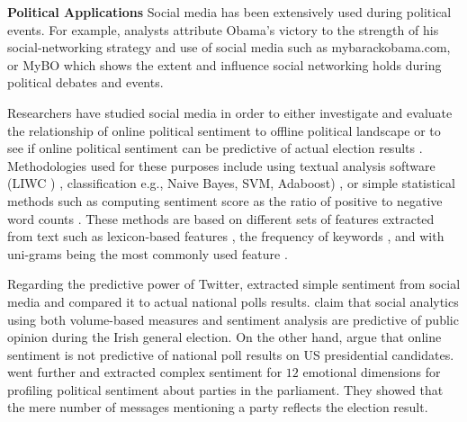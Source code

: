 \documentclass[11pt,a4paper]{article}
\begin{document}

\textbf{Political Applications}
Social media has been extensively used during political events. For example, analysts attribute Obama's victory to the strength of his social-networking strategy and use of social media such as mybarackobama.com, or MyBO \cite{tumasjan} which shows the extent and influence social networking holds during political debates and events.

Researchers have studied social media in order to either investigate and evaluate the relationship of online political sentiment to offline political landscape \cite{tumasjan, bakliwal, oconnorPolitics, wangCan} or to see if online political sentiment can be predictive of actual election results \cite{mejova, bermingham}. Methodologies used for these purposes include using textual analysis software (LIWC \cite{LWIC07}) \cite{tumasjan}, classification e.g., Naive Bayes, SVM, Adaboost) \cite{mejova, wangCan, bermingham, bakliwal}, or simple statistical methods such as computing sentiment score as the ratio of positive to negative word counts \cite{oconnorPolitics}. These methods are based on different sets of features extracted from text such as lexicon-based features \cite{bakliwal}, the frequency of keywords \cite{tumasjan, oconnorPolitics}, and with uni-grams being the most commonly used feature \cite{mejova, wangCan, bermingham}.

Regarding the predictive power of Twitter, \cite{bermingham, mejova} extracted simple sentiment from social media and compared it to actual national polls results. \citet{bermingham} claim that social analytics using both volume-based measures and sentiment analysis are predictive of public opinion during the Irish general election. On the other hand, \citet{mejova} argue that online sentiment is not predictive of national poll results on US presidential candidates. \citet{tumasjan} went further and extracted complex sentiment for $12$ emotional dimensions for profiling political sentiment about parties in the parliament. They showed that the mere number of messages mentioning a party reflects the election result.
\end{document}
